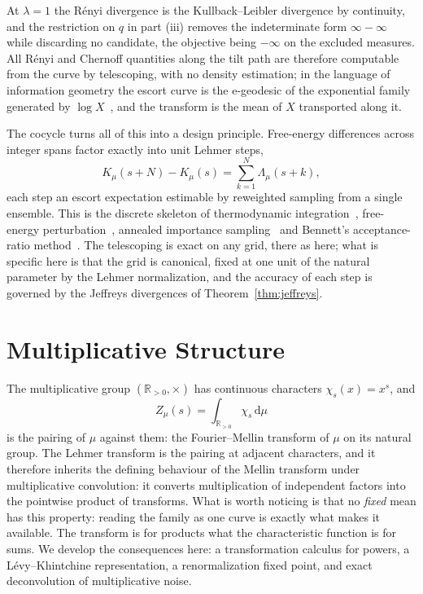 \documentclass[sn-mathphys-num]{sn-jnl}
\theoremstyle{thmstyleone}%
\theoremstyle{thmstyletwo}%
\theoremstyle{thmstylethree}%
\theoremstyle{thmstyleone}%
\providecommand{\Rpos}{\mathbb{R}_{>0}}
\providecommand{\dd}{\,\mathrm{d}}
\begin{document}
	At $\lambda=1$ the R\'enyi divergence is the Kullback--Leibler
	divergence by continuity, and the restriction on $q$ in part (iii)
	removes the indeterminate form $\infty-\infty$ while discarding no
	candidate, the objective being $-\infty$ on the excluded measures.
	All R\'enyi and Chernoff quantities along the tilt path are
	therefore computable from the curve by telescoping, with no density
	estimation; in the language of information geometry the escort
	curve is the e-geodesic of the exponential family generated by
	$\log X$~\cite{amari2000}, and the transform is the mean of $X$
	transported along it.
	
	The cocycle turns all of this into a design principle. Free-energy
	differences across integer spans factor exactly into unit Lehmer
	steps,
	\begin{equation}\label{eq:thermint}
		K_\mu(s+N)-K_\mu(s)=\sum_{k=1}^N\Lambda_\mu(s+k),
	\end{equation}
	each step an escort expectation estimable by reweighted sampling
	from a single ensemble. This is the discrete skeleton of
	thermodynamic integration~\cite{kirkwood1935}, free-energy
	perturbation~\cite{zwanzig1954}, annealed importance
	sampling~\cite{neal2001} and Bennett's acceptance-ratio
	method~\cite{bennett1976,shirts2008}. The telescoping is exact on
	any grid, there as here; what is specific here is that the grid is
	canonical, fixed at one unit of the natural parameter by the Lehmer
	normalization, and the accuracy of each step is governed by the
	Jeffreys divergences of Theorem~\ref{thm:jeffreys}.
	
	\section{Multiplicative Structure}\label{sec:multiplicative}
	
	The multiplicative group $(\Rpos,\times)$ has continuous characters
	$\chi_s(x)=x^{s}$, and
	\begin{equation}\label{eq:pairing}
		Z_\mu(s)=\int_{\Rpos}\chi_s\dd\mu
	\end{equation}
	is the pairing of $\mu$ against them: the Fourier--Mellin transform
	of $\mu$ on its natural group. The Lehmer transform is the pairing at
	adjacent characters, and it therefore inherits the defining behaviour
	of the Mellin transform under multiplicative convolution: it converts
	multiplication of independent factors into the pointwise product of
	transforms. What is worth noticing is that no \emph{fixed} mean has
	this property: reading the family as one curve is exactly what makes
	it available. The
	transform is for products what the characteristic function is for
	sums. We develop the
	consequences here: a transformation calculus for powers, a
	L\'evy--Khintchine representation, a renormalization fixed point,
	and exact deconvolution of multiplicative noise.
	
\end{document}
